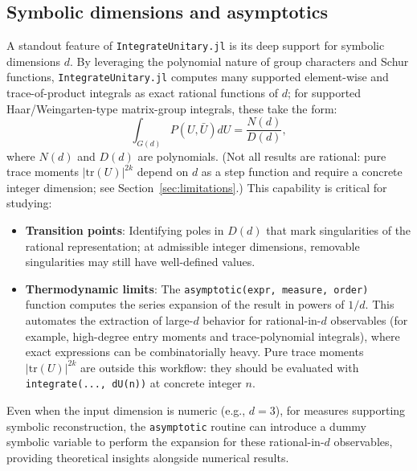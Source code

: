 \documentclass[manuscript,screen]{acmart}
\begin{document}
\subsection{Symbolic dimensions and asymptotics}
A standout feature of \texttt{IntegrateUnitary.jl} is its deep support for symbolic dimensions $d$.
By leveraging the polynomial nature of group characters and Schur functions,
\texttt{IntegrateUnitary.jl} computes many supported element-wise and trace-of-product
integrals as exact rational functions of $d$; for supported
Haar/Weingarten-type matrix-group integrals, these take the form:
\begin{equation}
\int_{G(d)} P(U, \bar{U}) dU = \frac{N(d)}{D(d)},
\end{equation}
where $N(d)$ and $D(d)$ are polynomials. (Not all results are rational: pure trace moments $|\mathrm{tr}(U)|^{2k}$ depend on $d$ as a step function and require a concrete integer dimension; see Section~\ref{sec:limitations}.) This capability is critical for studying:
\begin{itemize}
    \item \textbf{Transition points}: Identifying poles in $D(d)$ that mark
    singularities of the rational representation; at admissible integer
    dimensions, removable singularities may still have well-defined values.
    \item \textbf{Thermodynamic limits}: The \texttt{asymptotic(expr, measure, order)}
    function computes the series expansion of the result in powers of $1/d$.
    This automates the extraction of large-$d$ behavior for rational-in-$d$
    observables (for example, high-degree entry moments and trace-polynomial
    integrals), where exact expressions can be combinatorially heavy.
    Pure trace moments $|\mathrm{tr}(U)|^{2k}$ are outside this workflow:
    they should be evaluated with \texttt{integrate(..., dU(n))} at concrete
    integer $n$.
\end{itemize}
Even when the input dimension is numeric (e.g., $d=3$), for measures supporting
symbolic reconstruction, the \texttt{asymptotic} routine can introduce a dummy
symbolic variable to perform the expansion for these rational-in-$d$
observables, providing theoretical insights alongside numerical results.
\end{document}
